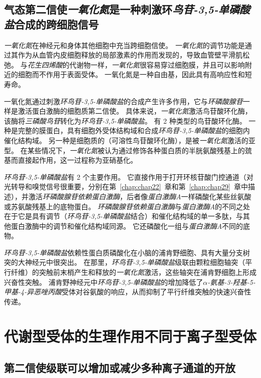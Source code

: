 \subsection{气态第二信使\textit{一氧化氮}是一种刺激环\textit{鸟苷-3,5-单磷酸盐}合成的跨细胞信号}

\textit{一氧化氮}在神经元和身体其他细胞中充当跨细胞信使。
\textit{一氧化氮}的调节功能是通过其作为从血管内皮细胞释放的局部激素的作用而发现的，导致血管壁平滑肌松弛。
与\textit{花生四烯酸}的代谢物一样，\textit{一氧化氮}很容易穿过细胞膜，并且可以影响附近的细胞而不作用于表面受体。
一氧化氮是一种自由基，因此具有高响应性和短寿命。


一氧化氮通过刺激\textit{环鸟苷-3,5-单磷酸盐}的合成产生许多作用，它与\textit{环磷酸腺苷}一样是激活蛋白激酶的细胞质第二信使。
具体来说，\textit{一氧化氮}激活鸟苷酸环化酶，该酶将\textit{三磷酸鸟苷}转化为\textit{环鸟苷-3,5-单磷酸盐}。
有 2 种类型的鸟苷酸环化酶。
一种是完整的膜蛋白，具有细胞外受体结构域和合成\textit{环鸟苷-3,5-单磷酸盐}的细胞内催化结构域。
另一种是细胞质的（可溶性鸟苷酸环化酶），是被\textit{一氧化氮}激活的亚型。
在某些情况下，\textit{一氧化氮}被认为通过修饰各种蛋白质的半胱氨酸残基上的巯基而直接起作用，这一过程称为亚硝基化。


\textit{环鸟苷-3,5-单磷酸盐}有 2 个主要作用。
它直接作用于打开环核苷酸门控通道（对光转导和嗅觉信号很重要，分别在第~\ref{chap:chap22}~章和第~\ref{chap:chap29}~章中描述），并激活\textit{环磷酸腺苷依赖蛋白激酶}，后者像\textit{蛋白激酶A}一样磷酸化某些丝氨酸或苏氨酸残基上的底物蛋白。
\textit{环磷酸腺苷依赖蛋白激酶}与\textit{蛋白激酶A}的不同之处在于它是具有调节（\textit{环鸟苷-3,5-单磷酸盐}结合）和催化结构域的单一多肽，与其他蛋白激酶中的调节和催化结构域同源。
它还磷酸化一组与\textit{蛋白激酶A}不同的底物。


\textit{环鸟苷-3,5-单磷酸盐}依赖性蛋白质磷酸化在小脑的浦肯野细胞、具有大量分支树突的大神经元中很突出。
在那里，\textit{环鸟苷-3,5-单磷酸盐}级联由颗粒细胞轴突（平行纤维）的突触前末梢产生和释放的\textit{一氧化氮}激活，这些轴突在浦肯野细胞上形成兴奋性突触。
浦肯野神经元中\textit{环鸟苷-3,5-单磷酸盐}的增加降低了\textit{$\alpha$-氨基-3-羟基-5-甲基-4-异恶唑丙酸}受体对谷氨酸的响应，从而抑制了平行纤维突触的快速兴奋性传递。



\section{代谢型受体的生理作用不同于离子型受体}

\subsection{第二信使级联可以增加或减少多种离子通道的开放}

